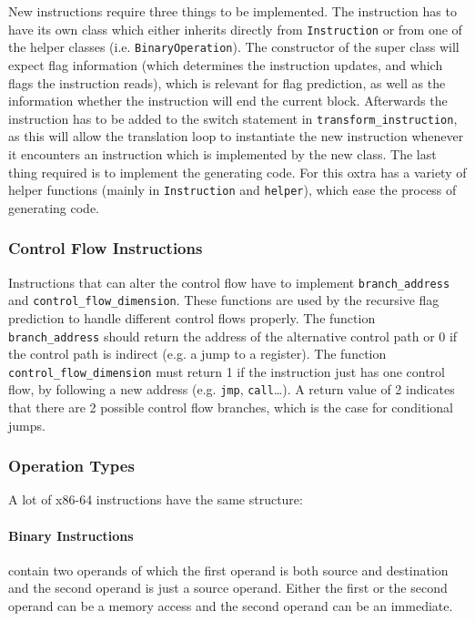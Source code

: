 	New instructions require three things to be implemented. The instruction has to have its own class which either inherits directly from \texttt{Instruction} or from one of the helper classes (i.e. \texttt{BinaryOperation}). The constructor of the super class will expect flag information (which determines the instruction updates, and which flags the instruction reads), which is relevant for flag prediction, as well as the information whether the instruction will end the current block. Afterwards the instruction has to be added to the switch statement in \texttt{transform\_instruction}, as this will allow the translation loop to instantiate the new instruction whenever it encounters an instruction which is implemented by the new class. The last thing required is to implement the generating code. For this oxtra has a variety of helper functions (mainly in \texttt{Instruction} and \texttt{helper}), which ease the process of generating code. 
	
	\subsubsection{Control Flow Instructions}
		Instructions that can alter the control flow have to implement \texttt{branch\_address} and \texttt{control\_flow\_dimension}. These functions are used by the recursive flag prediction to handle different control flows properly. The function \texttt{branch\_address} should return the address of the alternative control path or 0 if the control path is indirect (e.g. a jump to a register). The function \texttt{control\_flow\_dimension} must return 1 if the instruction just has one control flow, by following a new address (e.g. \texttt{jmp}, \texttt{call}\dots). A return value of 2 indicates that there are 2 possible control flow branches, which is the case for conditional jumps.

	\subsubsection{Operation Types}
		\label{Binary Operation and Unary Operation}
		A lot of x86-64 instructions have the same structure:

		\paragraph{Binary Instructions} contain two operands of which the first operand is both source and destination and the second operand is just a source operand. Either the first or the second operand can be a memory access and the second operand can be an immediate.
		
